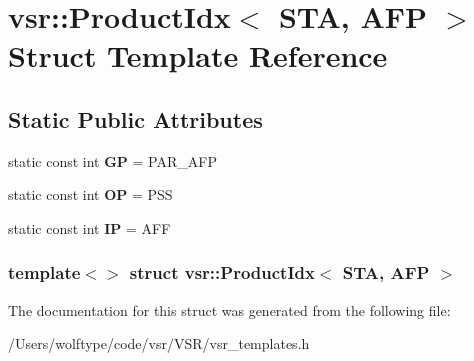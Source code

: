 \hypertarget{structvsr_1_1_product_idx_3_01_s_t_a_00_01_a_f_p_01_4}{\section{vsr\-:\-:Product\-Idx$<$ S\-T\-A, A\-F\-P $>$ Struct Template Reference}
\label{structvsr_1_1_product_idx_3_01_s_t_a_00_01_a_f_p_01_4}
}
\subsection*{Static Public Attributes}
\begin{DoxyCompactItemize}
\item 
\hypertarget{structvsr_1_1_product_idx_3_01_s_t_a_00_01_a_f_p_01_4_a523f918c926278259583ea9ddfd35fad}{static const int {\bfseries G\-P} = P\-A\-R\-\_\-\-A\-F\-P}\label{structvsr_1_1_product_idx_3_01_s_t_a_00_01_a_f_p_01_4_a523f918c926278259583ea9ddfd35fad}

\item 
\hypertarget{structvsr_1_1_product_idx_3_01_s_t_a_00_01_a_f_p_01_4_a7f97090b41da31da5f95e94b43812a65}{static const int {\bfseries O\-P} = P\-S\-S}\label{structvsr_1_1_product_idx_3_01_s_t_a_00_01_a_f_p_01_4_a7f97090b41da31da5f95e94b43812a65}

\item 
\hypertarget{structvsr_1_1_product_idx_3_01_s_t_a_00_01_a_f_p_01_4_ae25af54394b386ee3c01778b589a95af}{static const int {\bfseries I\-P} = A\-F\-F}\label{structvsr_1_1_product_idx_3_01_s_t_a_00_01_a_f_p_01_4_ae25af54394b386ee3c01778b589a95af}

\end{DoxyCompactItemize}
\subsubsection*{template$<$$>$ struct vsr\-::\-Product\-Idx$<$ S\-T\-A, A\-F\-P $>$}



The documentation for this struct was generated from the following file\-:\begin{DoxyCompactItemize}
\item 
/\-Users/wolftype/code/vsr/\-V\-S\-R/vsr\-\_\-templates.\-h\end{DoxyCompactItemize}

